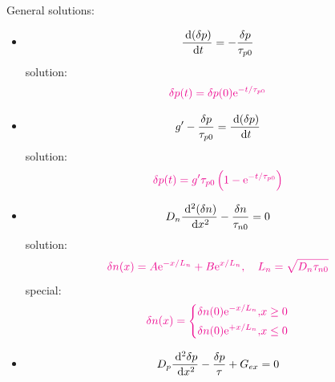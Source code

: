 \documentclass[a4paper, twocolumn]{article}
\begin{document}
    \par General solutions:
    \begin{itemize}
        \item 
            \begin{equation*}
                \frac{\: \mathrm{d} (\delta p)}{\: \mathrm{d} t}  = - \frac{\delta p}{\tau_{p0}} 
            \end{equation*}
            solution:
            \begin{equation*}
                \color{magenta} \delta p(t) = \delta p(0) \mathrm{e}^{- t/ \tau_{p0}} 
            \end{equation*}
        \item 
            \begin{equation*}
                g^\prime - \frac{\delta p}{\tau_{p0}} = \frac{\: \mathrm{d} (\delta p)}{\: \mathrm{d} t}  
            \end{equation*}
            solution:
            \begin{equation*}
                \color{magenta} \delta p(t) = g^\prime \tau_{p0} \left( 1 - \mathrm{e}^{- t / \tau_{p0}}  \right)
            \end{equation*}
        \item 
            \begin{equation*}
                D_n \frac{\: \mathrm{d} ^2 (\delta n)}{\: \mathrm{d} x^2} - \frac{\delta n}{\tau_{n0}} = 0
            \end{equation*}
            solution:
            \begin{equation*}
                \color{magenta}
                \delta n(x) = A \mathrm{e}^{- x/L_n} + B \mathrm{e}^{x/L_n}, \quad L_n = \sqrt{D_n \tau_{n0}}
            \end{equation*}
            special:
            \begin{equation*}
                \color{magenta}
                \delta n(x) = 
                \left\{
                    \begin{aligned}
                        \delta n(0) \mathrm{e}^{-x / L_n}, &x \ge 0 \\
                        \delta n(0) \mathrm{e}^{+x/L_n}, &x \le 0
                    \end{aligned}
                \right.
            \end{equation*}
        \item 
            \begin{equation*}
                D_p \frac{\: \mathrm{d} ^2 \delta p}{\: \mathrm{d} x^2} - \frac{\delta p}{\tau} + G_{ex} = 0
            \end{equation*}

\end{itemize}
\end{document}
